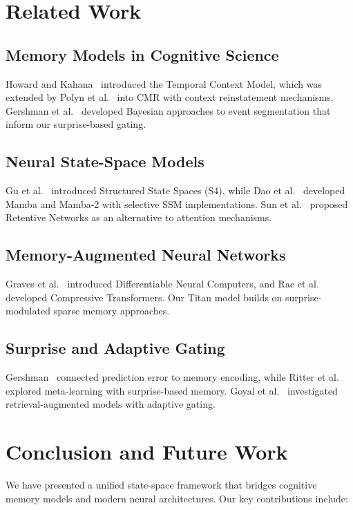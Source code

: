 \documentclass[11pt]{article}
\begin{document}
\section{Related Work}

\subsection{Memory Models in Cognitive Science}
Howard and Kahana~\cite{howard2002temporal} introduced the Temporal Context Model, which was extended by Polyn et al.~\cite{polyn2009context} into CMR with context reinstatement mechanisms. Gershman et al.~\cite{gershman2017bayesian} developed Bayesian approaches to event segmentation that inform our surprise-based gating.

\subsection{Neural State-Space Models}
Gu et al.~\cite{gu2021s4} introduced Structured State Spaces (S4), while Dao et al.~\cite{dao2023mamba} developed Mamba and Mamba-2 with selective SSM implementations. Sun et al.~\cite{sun2023retnet} proposed Retentive Networks as an alternative to attention mechanisms.

\subsection{Memory-Augmented Neural Networks}
Graves et al.~\cite{graves2016dnc} introduced Differentiable Neural Computers, and Rae et al.~\cite{rae2020compressive} developed Compressive Transformers. Our Titan model builds on surprise-modulated sparse memory approaches.

\subsection{Surprise and Adaptive Gating}
Gershman~\cite{gershman2019prediction} connected prediction error to memory encoding, while Ritter et al.~\cite{ritter2018meta} explored meta-learning with surprise-based memory. Goyal et al.~\cite{goyal2022retrieval} investigated retrieval-augmented models with adaptive gating.

\section{Conclusion and Future Work}

We have presented a unified state-space framework that bridges cognitive memory models and modern neural architectures. Our key contributions include:
\end{document}
